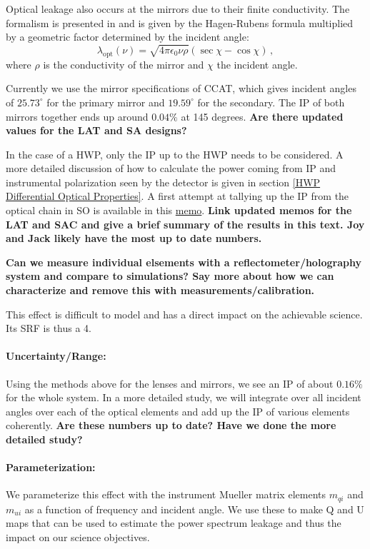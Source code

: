 Optical leakage also occurs at the mirrors due to their finite conductivity. 
The formalism is presented in \cite{Barkats:2005sh} and is given by the Hagen-Rubens formula multiplied by 
a geometric factor determined by the incident angle:
\begin{equation}
\lambda_\text{opt}(\nu) = \sqrt{4 \pi \epsilon_0 \nu \rho} (\sec \chi - \cos \chi) \, ,
\end{equation}
where $\rho$ is the conductivity of the mirror and $\chi$ the incident angle.

Currently we use the mirror specifications of CCAT, which gives incident angles of $25.73^\circ$ for the primary mirror 
and $19.59^\circ$ for the secondary. The IP of both mirrors together ends up around $0.04\%$ at 145 degrees. \textbf{Are there updated values for the LAT and SA designs?}

In the case of a HWP, only the IP up to the HWP needs to be considered.
A more detailed discussion of how to calculate the power coming from IP and instrumental polarization
seen by the detector is given in section \ref{HWP Differential Optical Properties}.
A first attempt at tallying up the IP from the optical chain in SO is available in this \href{http://simonsobservatory.wdfiles.com/local--files/calandsys-telecon/eb_leakage_from_pointing_error.pdf?ukey=61f26ef33e8439a4e7096ab52c54c523066a4e35}{memo}. \textbf{Link updated memos for the LAT and SAC and give a brief summary of the results in this text. Joy and Jack likely have the most up to date numbers.}

\textbf{Can we measure individual elsements with a reflectometer/holography system and compare to simulations? Say more about how we can characterize and remove this with measurements/calibration.}

This effect is difficult to model and has a direct impact on the achievable science. Its SRF is thus a 4.

\paragraph{Uncertainty/Range:}
Using the methods above for the lenses and mirrors, we see an IP of about $0.16\%$ for the whole system.
In a more detailed study, we will integrate over all incident angles over each of the optical elements and add up the IP of various elements coherently. \textbf{Are these numbers up to date? Have we done the more detailed study?}

\paragraph{Parameterization:}
We parameterize this effect with the instrument Mueller matrix elements $m_{qi}$ and $m_{ui}$ as a function of frequency and incident angle. We use these to make Q and U maps that can be used to estimate the power spectrum leakage and thus the impact on our science objectives.
